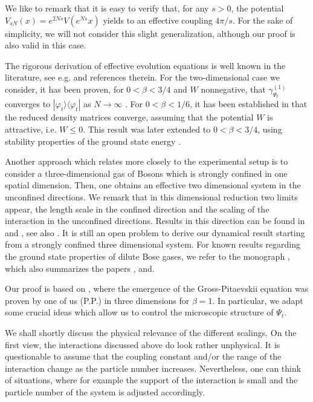 \documentclass[11pt, english, american]{article}
\renewcommand{\phi}{\varphi}
\begin{document}
We like to remark that it is easy to verify that, for any $s>0$, the potential
$V_{sN}(x)= e^{2Ns} V(e^{Ns}x)$ yields to an effective coupling $4 \pi / s$. For the sake of simplicity, we will not consider this slight generalization, although our proof is also valid in this case.


The rigorous derivation of effective evolution equations is well known in the literature, see e.g. \cite{SchleinNorm, benedikter, erdos1, erdos2, erdos3, erdos4, knowles,  marcin1, marcin2,
 pickl2, picklgp3d, pickl1, rodnianskischlein}
 and references therein.
For the two-dimensional case we consider, it has been proven, for $0 <\beta <3/4$ and $W$ nonnegative, that $\gamma^{(1)}_{\Psi_t}$
 converges to $ |\phi_t\rangle\langle\phi_t|$ as $N \rightarrow \infty$ \cite{schlein2d}.
 For $0< \beta < 1/6$, it has been established in \cite{chen2d} that the reduced density matrices converge, assuming that the potential $W$ is attractive, i.e. $W \leq 0$.  This result was later extended to $0<\beta <3/4$, using stability properties of the ground state energy \cite{lewin}.

Another approach which relates more closely to the experimental setup is to consider a three-dimensional gas of Bosons which is strongly confined in one spatial dimension. Then, one obtains an effective two dimensional system in the unconfined  directions. We remark that in this dimensional reduction two limits appear, the length scale in the confined direction and the scaling of the interaction in the unconfined directions.
Results in this direction can be found in \cite{abdallah} and \cite{keler}, see also \cite{teufel}.
It is still an open problem to derive our dynamical result starting from a strongly confined three dimensional system.
For known results regarding the ground state properties of dilute Bose gases, we refer to the monograph \cite{lssy}, which also summarizes the papers \cite{lieb100bec}, \cite{lsy} and\cite{ls}.


Our proof is based on \cite{picklgp3d}, where the emergence of the Gross-Pitaevskii equation was proven by one of us (P.P.) in three dimensions for $\beta=1$. In particular, we adapt some crucial ideas which allow us to control the microscopic structure of $\Psi_t$.

We shall shortly discuss the physical relevance of the different scalings. On the first view, the interactions discussed above do look rather unphysical. It is questionable to assume that the coupling constant and/or the range of the interaction change as the particle number increases.
Nevertheless, one can think of situations,
where for example the support of the interaction is small and the particle number of the system is adjusted accordingly.
\end{document}
